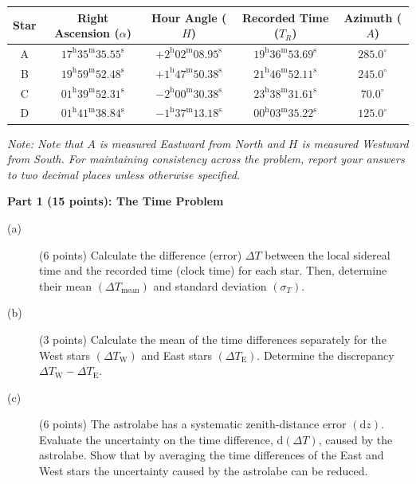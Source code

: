 \begin{center}
\begin{tabular}{ccccc}
\toprule
Star & Right Ascension ($\alpha$) & Hour Angle ($H$) & Recorded Time ($T_R$) & Azimuth ($A$) \\
\midrule
A & $17^{\mathrm{h}}35^{\mathrm{m}}35.55^{\mathrm{s}}$ & $+2^{\mathrm{h}}02^{\mathrm{m}}08.95^{\mathrm{s}}$ & $19^{\mathrm{h}}36^{\mathrm{m}}53.69^{\mathrm{s}}$ & $285.0^\circ$ \\
B & $19^{\mathrm{h}}59^{\mathrm{m}}52.48^{\mathrm{s}}$ & $+1^{\mathrm{h}}47^{\mathrm{m}}50.38^{\mathrm{s}}$ & $21^{\mathrm{h}}46^{\mathrm{m}}52.11^{\mathrm{s}}$ & $245.0^\circ$ \\
C & $01^{\mathrm{h}}39^{\mathrm{m}}52.31^{\mathrm{s}}$ & $-2^{\mathrm{h}}00^{\mathrm{m}}30.38^{\mathrm{s}}$ & $23^{\mathrm{h}}38^{\mathrm{m}}31.61^{\mathrm{s}}$ & $70.0^\circ$ \\
D & $01^{\mathrm{h}}41^{\mathrm{m}}38.84^{\mathrm{s}}$ & $-1^{\mathrm{h}}37^{\mathrm{m}}13.18^{\mathrm{s}}$ & $00^{\mathrm{h}}03^{\mathrm{m}}35.22^{\mathrm{s}}$ & $125.0^\circ$ \\
\bottomrule
\end{tabular}
\end{center}

\emph{Note: Note that $A$ is measured Eastward from North and $H$ is measured
Westward from South. For maintaining consistency across the problem, report
your answers to two decimal places unless otherwise specified.}

\medskip\noindent\textbf{Part 1 (15 points): The Time Problem}

\begin{description}
\item[(a)] (6 points) Calculate the difference (error) $\Delta T$ between the
  local sidereal time and the recorded time (clock time) for each star. Then,
  determine their mean $(\Delta T_{\mathrm{mean}})$ and standard deviation
  $(\sigma_T)$.
\item[(b)] (3 points) Calculate the mean of the time differences separately
  for the West stars $(\Delta T_{\mathrm{W}})$ and East stars
  $(\Delta T_{\mathrm{E}})$. Determine the discrepancy
  $\Delta T_{\mathrm{W}} - \Delta T_{\mathrm{E}}$.
\item[(c)] (6 points) The astrolabe has a systematic zenith-distance error
  $(\mathrm{d}z)$. Evaluate the uncertainty on the time difference,
  $\mathrm{d}(\Delta T)$, caused by the astrolabe. Show that by averaging the
  time differences of the East and West stars the uncertainty caused by the
  astrolabe can be reduced.
\end{description}

